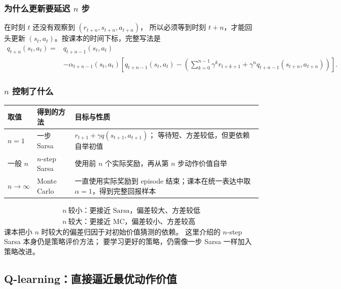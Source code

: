 \documentclass[11pt,a4paper,fontset=fandol]{ctexart}
\begin{document}
\subsubsection{为什么更新要延迟 \(n\) 步}

在时刻 \(t\) 还没有观察到
\((r_{t+n},s_{t+n},a_{t+n})\)，
所以必须等到时刻 \(t+n\)，才能回头更新
\((s_t,a_t)\)。按课本的时间下标，完整写法是
\[
\begin{aligned}
q_{t+n}(s_t,a_t)
={}&q_{t+n-1}(s_t,a_t)\\
&-\alpha_{t+n-1}(s_t,a_t)
\left[
q_{t+n-1}(s_t,a_t)
-\left(
\sum_{k=0}^{n-1}\gamma^k r_{t+k+1}
+\gamma^n q_{t+n-1}(s_{t+n},a_{t+n})
\right)
\right].
\end{aligned}
\]

\subsubsection{\texorpdfstring{\(n\)}{n} 控制了什么}

\begin{center}
\begin{tabularx}{\textwidth}{
  >{\raggedright\arraybackslash}p{}
  >{\raggedright\arraybackslash}p{}
  X}
\toprule
取值 & 得到的方法 & 目标与性质\\
\midrule
\(n=1\) &
一步 Sarsa &
\(r_{t+1}+\gamma q(s_{t+1},a_{t+1})\)；
等待短、方差较低，但更依赖自举初值\\
一般 \(n\) &
\(n\)-step Sarsa &
使用前 \(n\) 个实际奖励，再从第 \(n\) 步动作价值自举\\
\(n\to\infty\) &
Monte Carlo &
一直使用实际奖励到 episode 结束；课本在统一表达中取
\(\alpha=1\)，得到完整回报样本\\
\bottomrule
\end{tabularx}
\end{center}

\[
\boxed{
\begin{array}{c}
n\ \text{较小：更接近 Sarsa，偏差较大、方差较低}\\[0.25em]
n\ \text{较大：更接近 MC，偏差较小、方差较高}
\end{array}}
\]
课本把小 \(n\) 时较大的偏差归因于对初始价值猜测的依赖。
这里介绍的 \(n\)-step Sarsa 本身仍是策略评价方法；
要学习更好的策略，仍需像一步 Sarsa 一样加入策略改进。

\subsection{Q-learning：直接逼近最优动作价值}
\end{document}
